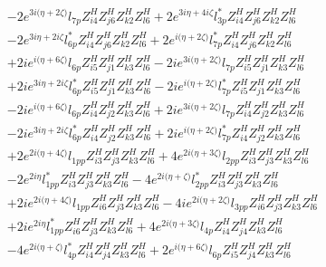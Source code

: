 \begin{align}
 &-2 e^{3 i \Big(\eta +2 \zeta \Big)} l_{7p} Z_{{i 4}}^{H} Z_{{j 6}}^{H} Z_{{k 2}}^{H} Z_{{l 6}}^{H} +2 e^{3 i \eta +4 i \zeta } l_{3p}^* Z_{{i 4}}^{H} Z_{{j 6}}^{H} Z_{{k 2}}^{H} Z_{{l 6}}^{H} \nonumber \\ 
 &-2 e^{3 i \eta +2 i \zeta } l_{6p}^* Z_{{i 4}}^{H} Z_{{j 6}}^{H} Z_{{k 2}}^{H} Z_{{l 6}}^{H} +2 e^{i \Big(\eta +2 \zeta \Big)} l_{7p}^* Z_{{i 4}}^{H} Z_{{j 6}}^{H} Z_{{k 2}}^{H} Z_{{l 6}}^{H} \nonumber \\ 
 &+2 i e^{i \Big(\eta +6 \zeta \Big)} l_{6p} Z_{{i 5}}^{H} Z_{{j 1}}^{H} Z_{{k 3}}^{H} Z_{{l 6}}^{H} -2 i e^{3 i \Big(\eta +2 \zeta \Big)} l_{7p} Z_{{i 5}}^{H} Z_{{j 1}}^{H} Z_{{k 3}}^{H} Z_{{l 6}}^{H} \nonumber \\ 
 &+2 i e^{3 i \eta +2 i \zeta } l_{6p}^* Z_{{i 5}}^{H} Z_{{j 1}}^{H} Z_{{k 3}}^{H} Z_{{l 6}}^{H} -2 i e^{i \Big(\eta +2 \zeta \Big)} l_{7p}^* Z_{{i 5}}^{H} Z_{{j 1}}^{H} Z_{{k 3}}^{H} Z_{{l 6}}^{H} \nonumber \\ 
 &-2 i e^{i \Big(\eta +6 \zeta \Big)} l_{6p} Z_{{i 4}}^{H} Z_{{j 2}}^{H} Z_{{k 3}}^{H} Z_{{l 6}}^{H} +2 i e^{3 i \Big(\eta +2 \zeta \Big)} l_{7p} Z_{{i 4}}^{H} Z_{{j 2}}^{H} Z_{{k 3}}^{H} Z_{{l 6}}^{H} \nonumber \\ 
 &-2 i e^{3 i \eta +2 i \zeta } l_{6p}^* Z_{{i 4}}^{H} Z_{{j 2}}^{H} Z_{{k 3}}^{H} Z_{{l 6}}^{H} +2 i e^{i \Big(\eta +2 \zeta \Big)} l_{7p}^* Z_{{i 4}}^{H} Z_{{j 2}}^{H} Z_{{k 3}}^{H} Z_{{l 6}}^{H} \nonumber \\ 
 &+2 e^{2 i \Big(\eta +4 \zeta \Big)} l_{1pp} Z_{{i 3}}^{H} Z_{{j 3}}^{H} Z_{{k 3}}^{H} Z_{{l 6}}^{H} +4 e^{2 i \Big(\eta +3 \zeta \Big)} l_{2pp} Z_{{i 3}}^{H} Z_{{j 3}}^{H} Z_{{k 3}}^{H} Z_{{l 6}}^{H} \nonumber \\ 
 &-2 e^{2 i \eta } l_{1pp}^* Z_{{i 3}}^{H} Z_{{j 3}}^{H} Z_{{k 3}}^{H} Z_{{l 6}}^{H} -4 e^{2 i \Big(\eta +\zeta \Big)} l_{2pp}^* Z_{{i 3}}^{H} Z_{{j 3}}^{H} Z_{{k 3}}^{H} Z_{{l 6}}^{H} \nonumber \\ 
 &+2 i e^{2 i \Big(\eta +4 \zeta \Big)} l_{1pp} Z_{{i 6}}^{H} Z_{{j 3}}^{H} Z_{{k 3}}^{H} Z_{{l 6}}^{H} -4 i e^{2 i \Big(\eta +2 \zeta \Big)} l_{3pp} Z_{{i 6}}^{H} Z_{{j 3}}^{H} Z_{{k 3}}^{H} Z_{{l 6}}^{H} \nonumber \\ 
 &+2 i e^{2 i \eta } l_{1pp}^* Z_{{i 6}}^{H} Z_{{j 3}}^{H} Z_{{k 3}}^{H} Z_{{l 6}}^{H} +4 e^{2 i \Big(\eta +3 \zeta \Big)} l_{4p} Z_{{i 4}}^{H} Z_{{j 4}}^{H} Z_{{k 3}}^{H} Z_{{l 6}}^{H} \nonumber \\ 
 &-4 e^{2 i \Big(\eta +\zeta \Big)} l_{4p}^* Z_{{i 4}}^{H} Z_{{j 4}}^{H} Z_{{k 3}}^{H} Z_{{l 6}}^{H} +2 e^{i \Big(\eta +6 \zeta \Big)} l_{6p} Z_{{i 5}}^{H} Z_{{j 4}}^{H} Z_{{k 3}}^{H} Z_{{l 6}}^{H} \nonumber \\ 

\end{align}
